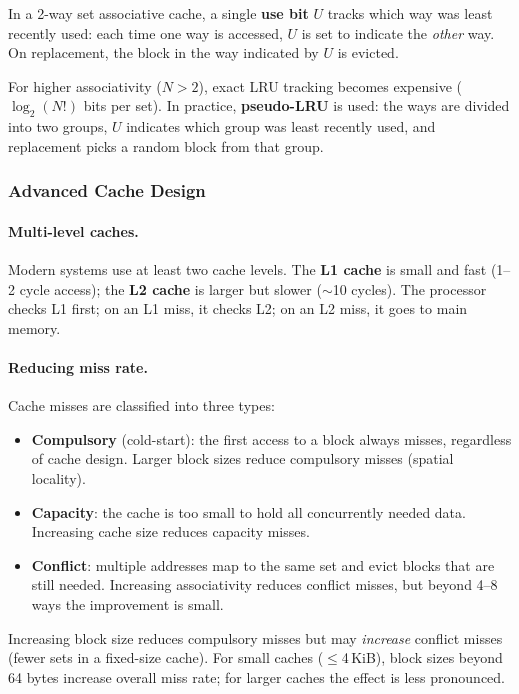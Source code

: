 \documentclass[9pt, a4paper]{extarticle}
\begin{document}
In a 2-way set associative cache, a single \textbf{use bit} $U$ tracks which way was least recently used: each time one way is accessed, $U$ is set to indicate the \emph{other} way. On replacement, the block in the way indicated by $U$ is evicted.

For higher associativity ($N > 2$), exact LRU tracking becomes expensive ($\log_2(N!)$ bits per set). In practice, \textbf{pseudo-LRU} is used: the ways are divided into two groups, $U$ indicates which group was least recently used, and replacement picks a random block from that group.

\subsubsection{Advanced Cache Design}

\paragraph{Multi-level caches.} Modern systems use at least two cache levels. The \textbf{L1 cache} is small and fast (1--2 cycle access); the \textbf{L2 cache} is larger but slower ($\sim$10 cycles). The processor checks L1 first; on an L1 miss, it checks L2; on an L2 miss, it goes to main memory.

\paragraph{Reducing miss rate.} Cache misses are classified into three types:

\begin{itemize}
    \item \textbf{Compulsory} (cold-start): the first access to a block always misses, regardless of cache design. Larger block sizes reduce compulsory misses (spatial locality).
    \item \textbf{Capacity}: the cache is too small to hold all concurrently needed data. Increasing cache size reduces capacity misses.
    \item \textbf{Conflict}: multiple addresses map to the same set and evict blocks that are still needed. Increasing associativity reduces conflict misses, but beyond 4--8 ways the improvement is small.
\end{itemize}

Increasing block size reduces compulsory misses but may \emph{increase} conflict misses (fewer sets in a fixed-size cache). For small caches ($\leq$4\,KiB), block sizes beyond 64 bytes increase overall miss rate; for larger caches the effect is less pronounced.
\end{document}
